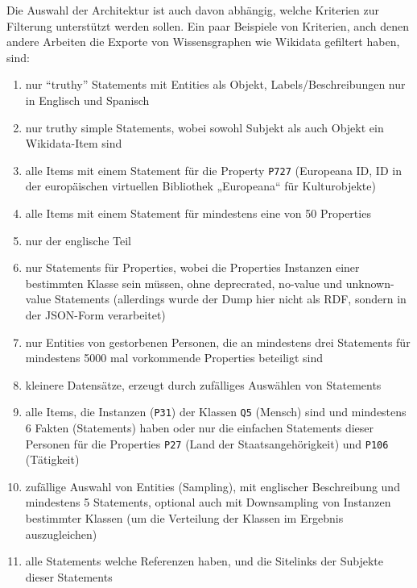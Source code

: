 Die Auswahl der Architektur ist auch davon abhängig, welche Kriterien zur Filterung unterstützt werden sollen.
Ein paar Beispiele von Kriterien, anch denen andere Arbeiten die Exporte von Wissensgraphen wie Wikidata gefiltert haben, sind:
\begin{enumerate}[label=\arabic*)]
  \item nur ``truthy'' Statements mit Entities als Objekt, Labels/Beschreibungen nur in Englisch und Spanisch\cite{usage-grafa}
  \item nur truthy simple Statements, wobei sowohl Subjekt als auch Objekt ein Wikidata-Item sind\cite{usage-wembedder}
  \item alle Items mit einem Statement für die Property \verb|P727| (Europeana ID, ID in der europäischen virtuellen Bibliothek „Europeana“ für Kulturobjekte)\cite{usage-europeana}
  \item alle Items mit einem Statement für mindestens eine von 50 Properties\cite{usage-narratives} 
  \item nur der englische Teil\cite{usage-web-tables} 
  \item nur Statements für Properties, wobei die Properties Instanzen einer bestimmten Klasse sein müssen, ohne deprecrated, no-value und unknown-value Statements\cite{usage-implicational-knowledge} (allerdings wurde der Dump hier nicht als RDF, sondern in der JSON-Form verarbeitet)
  \item nur Entities von gestorbenen Personen, die an mindestens drei Statements für mindestens 5000 mal vorkommende Properties beteiligt sind\cite{usage-learning-structured-embeddings}
  \item kleinere Datensätze, erzeugt durch zufälliges Auswählen von Statements\cite{usage-sparql-benchmark}
  \item alle Items, die Instanzen (\verb|P31|) der Klassen \verb|Q5| (Mensch) sind und mindestens 6 Fakten (Statements) haben\cite{usage-one-sentence} oder nur die einfachen Statements dieser Personen für die Properties \verb|P27| (Land der Staatsangehörigkeit) und \verb|P106| (Tätigkeit)\cite{usage-person-networks}
  \item zufällige Auswahl von Entities (Sampling), mit englischer Beschreibung und mindestens 5 Statements\cite{usage-generate-entity-type-desc}, optional auch mit Downsampling von Instanzen bestimmter Klassen (um die Verteilung der Klassen im Ergebnis auszugleichen)\cite{usage-synthesize-entity-desc}
  \item alle Statements welche Referenzen haben, und die Sitelinks der Subjekte dieser Statements\cite{wd-wk-common-references}
\end{enumerate}
